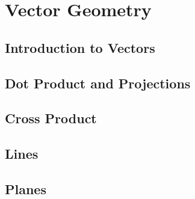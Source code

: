 \chapter{Vector Geometry}
\section{Introduction to Vectors}

\newpage
\section{Dot Product and Projections}

\newpage
\section{Cross Product}

\newpage
\section{Lines}

\newpage
\section{Planes}


